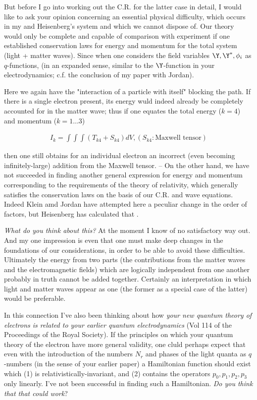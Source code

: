 \documentclass{article}
\newcommand{\nequ}[2]{
\begin{align*}
#1
\tag{#2}
\end{align*}
}
\begin{document}
But before I go into working out the C.R. for the latter case in detail, I would like to ask your opinion concerning an essential physical difficulty, which occurs in my and Heisenberg's system and which we cannot dispose of. Our theory would only be complete and capable of comparison with experiment if one established conservation laws for energy and momentum for the total system (light + matter waves). Since when one considers the field variables $\Y,\Y^*,\phi_i$ as $q$-functions,  (in an expanded sense, similar to the $\Y$-function in your electrodynamics; c.f. the conclusion of my paper with Jordan).


Here we again have the "interaction of a particle with itself" blocking the path. If there is a single electron present, its energy wuld indeed already be completely accounted for in the matter wave; thus if one equates the total energy ($k=4$) and momentum ($k=1\dots 3$)
\nequ{
I_k = \int\int\int (T_{k4} + S_{k4})dV, (S_{k4}: \text{Maxwell tensor})
}{1}
then one still obtains for an individual electron an incorrect (even becoming infinitely-large) addition from the Maxwell tensor. -- On the other hand, we have not succeeded in finding another general expression for energy and momentum corresponding to the requirements of the theory of relativity, which generally satisfies the conservation laws on the basis of our C.R. and wave equations. Indeed Klein amd Jordan have attempted here a peculiar change in the order of factors, but Heisenberg has calculated that .

\textit{What do you think about this?} At the moment I know of no satisfactory way out. And my one impression is even that one must make deep changes in the foundations of our considerations, in order to be able to avoid these difficulties. Ultimately the energy from two parts (the contributions from the matter waves and the electromagnetic fields) which are logically independent from one another probably in truth cannot be added together. Certainly an interpretation in which light and matter waves appear as one  (the former as a special case of the latter) would be preferable.

In this connection I've also been thinking about how \textit{your new quantum theory of electrons is related to your earlier quantum electrodynamics} (Vol 114 of the Proceedings of the Royal Society). If the principles on which your quantum theory of the electron have more general validity, one cluld perhaps expect that even with the introduction of the numbers $N_r$ and phases of the light quanta as $q$-numbers (in the sense of your earlier paper) a Hamiltonian function should exist which (1) is relativistically-invariant, and (2) contains the operators $p_0,p_1,p_2,p_3$ only linearly. I've not been successful in finding such a Hamiltonian. \textit{Do you think that that could work}?
\end{document}
